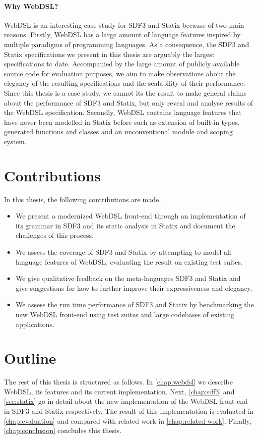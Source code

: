     \paragraph{Why WebDSL?} WebDSL is an interesting case study for SDF3 and Statix because of two main reasons. Firstly, WebDSL has a large amount of language features inspired by multiple paradigms of programming languages. As a consequence, the SDF3 and Statix specifications we present in this thesis are arguably the largest specifications to date. Accompanied by the large amount of publicly available source code for evaluation purposes, we aim to make observations about the elegancy of the resulting specifications and the scalability of their performance. Since this thesis is a case study, we cannot its the result to make general claims about the performance of SDF3 and Statix, but only reveal and analyse results of the WebDSL specification. Secondly, WebDSL contains language features that have never been modelled in Statix before such as extension of built-in types, generated functions and classes and an unconventional module and scoping system.

  \section{\label{sec:contributions}Contributions}

    In this thesis, the following contributions are made.

    \begin{itemize}
      \item We present a modernized WebDSL front-end through an implementation of its grammar in SDF3 and its static analysis in Statix and document the challenges of this process.
      \item We assess the coverage of SDF3 and Statix by attempting to model all language features of WebDSL, evaluating the result on existing test suites.
      \item We give qualitative feedback on the meta-languages SDF3 and Statix and give suggestions for how to further improve their expressiveness and elegancy.
      \item We assess the run time performance of SDF3 and Statix by benchmarking the new WebDSL front-end using test suites and large codebases of existing applications.
    \end{itemize}

  \section{\label{sec:outline}Outline}
    The rest of this thesis is structured as follows. In \cref{chap:webdsl} we describe WebDSL, its features and its current implementation. Next, \cref{chap:sdf3} and \cref{sec:statix} go in detail about the new implementation of the WebDSL front-end in SDF3 and Statix respectively. The result of this implementation is evaluated in \cref{chap:evaluation} and compared with related work in \cref{chap:related-work}. Finally, \cref{chap:conclusion} concludes this thesis.
